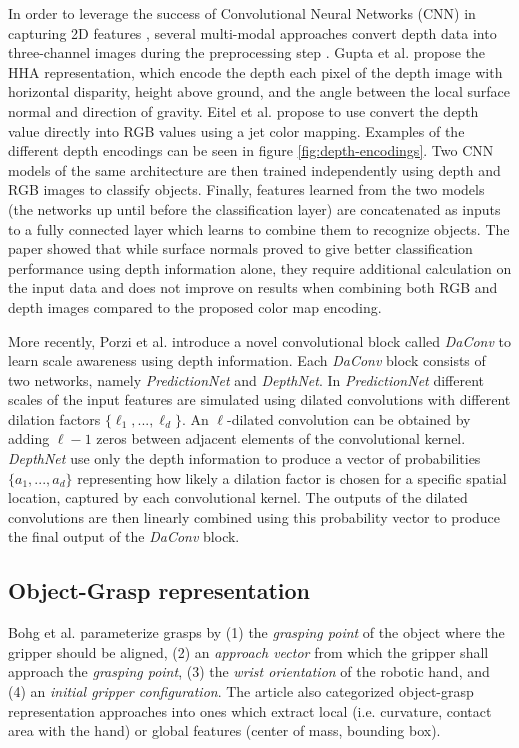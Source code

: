 In order to leverage the success of Convolutional Neural Networks (CNN) in capturing 2D features \cite{Gu2018}, several
multi-modal approaches convert depth data into three-channel images during the preprocessing step
\cite{Eitel2015,Gupta2014RGBDFeatures}. Gupta et al. \cite{Gupta2014RGBDFeatures} propose the HHA representation, which
encode the depth each pixel of the depth image with horizontal disparity, height above ground, and the angle between the
local surface normal and direction of gravity. Eitel et al. \cite{Eitel2015} propose to use convert the depth value
directly into RGB values using a jet color mapping. Examples of the different depth encodings can be seen in figure
\ref{fig:depth-encodings}. Two CNN models of the same architecture are then trained independently using depth and RGB
images to classify objects. Finally, features learned from the two models (the networks up until before the
classification layer) are concatenated as inputs to a fully connected layer which learns to combine them to recognize
objects. The paper showed that while surface normals proved to give better classification performance using depth
information alone, they require additional calculation on the input data and does not improve on results when combining
both RGB and depth images compared to the proposed color map encoding.

More recently, Porzi et al. \cite{Porzi2017} introduce a novel convolutional block called \emph{DaConv} to learn scale
awareness using depth information. Each \emph{DaConv} block consists of two networks, namely \emph{PredictionNet} and
\emph{DepthNet}. In \emph{PredictionNet} different scales of the input features are simulated using dilated convolutions
\cite{YuKoltun2016} with different dilation factors $ \{ \ell_1,...,\ell_d \} $. An $ \ell $-dilated convolution can be
obtained by adding $ \ell - 1 $ zeros between adjacent elements of the convolutional kernel. \emph{DepthNet} use only
the depth information to produce a vector of probabilities $ \{ a_1,...,a_d \} $ representing how likely a dilation
factor is chosen for a specific spatial location, captured by each convolutional kernel. The outputs of the dilated
convolutions are then linearly combined using this probability vector to produce the final output of the \emph{DaConv}
block.

\subsection{Object-Grasp representation}
Bohg et al. \cite{Bohg2014} parameterize grasps by (1) the \emph{grasping point} of the object where the gripper
should be aligned, (2) an \emph{approach vector} from which the gripper shall approach the \emph{grasping point},
(3) the \emph{wrist orientation} of the robotic hand, and (4) an \emph{initial gripper configuration}.
The article also categorized object-grasp representation approaches into ones which extract local (i.e. curvature,
contact area with the hand) or global features (center of mass, bounding box).

